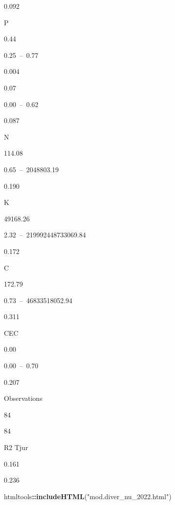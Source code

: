 \documentclass[
]{article}
\newenvironment{Shaded}{\begin{snugshade}}{\end{snugshade}}
\newcommand{\FunctionTok}[1]{\textcolor[rgb]{0.13,0.29,0.53}{\textbf{#1}}}
\newcommand{\NormalTok}[1]{#1}
\newcommand{\SpecialCharTok}[1]{\textcolor[rgb]{0.81,0.36,0.00}{\textbf{#1}}}
\newcommand{\StringTok}[1]{\textcolor[rgb]{0.31,0.60,0.02}{#1}}
\begin{document}
0.092

P

0.44

0.25~--~0.77

0.004

0.07

0.00~--~0.62

0.087

N

114.08

0.65~--~2048803.19

0.190

K

49168.26

2.32~--~219992448733069.84

0.172

C

172.79

0.73~--~46833518052.94

0.311

CEC

0.00

0.00~--~0.70

0.207

Observations

84

84

R2 Tjur

0.161

0.236

\begin{Shaded}
\begin{Highlighting}[]
\NormalTok{htmltools}\SpecialCharTok{::}\FunctionTok{includeHTML}\NormalTok{(}\StringTok{"mod.diver\_nu\_2022.html"}\NormalTok{)}
\end{Highlighting}
\end{Shaded}
\end{document}
